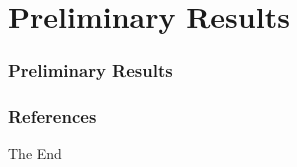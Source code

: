 \documentclass{beamer}
\theoremstyle{plain}
\begin{document}
\section{Preliminary Results}
\begin{frame}
\frametitle{Preliminary Results}

\end{frame}


\begin{frame}[allowframebreaks]
\frametitle{References}


\end{frame}


\begin{frame}
\Huge{\centerline{The End}}
\end{frame}

\end{document}
